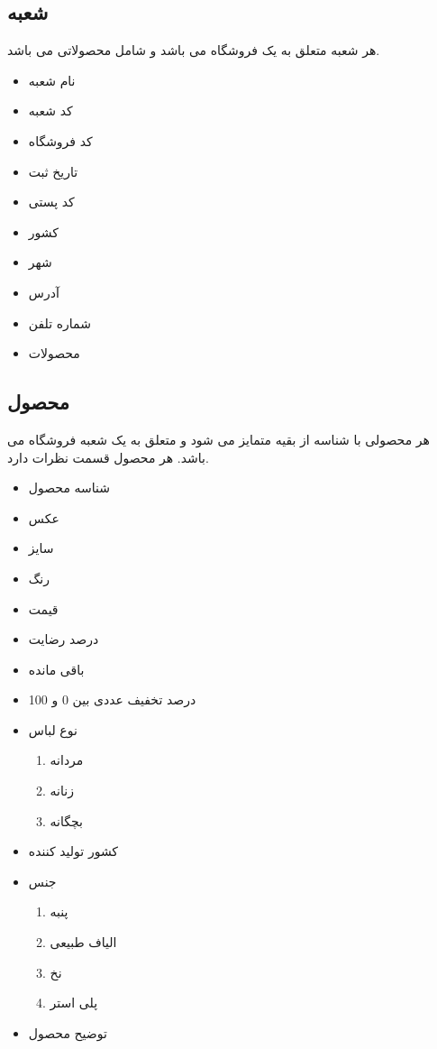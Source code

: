 \documentclass[]{article}
\begin{document}
\subsection{شعبه}
هر شعبه متعلق به یک فروشگاه می باشد و شامل محصولاتی می باشد.
\begin{itemize}
\item نام شعبه
\item کد شعبه
\item کد فروشگاه
\item تاریخ ثبت  
\item کد پستی
\item کشور
\item شهر
\item آدرس
\item شماره تلفن
\item محصولات
\end{itemize}



\subsection{محصول}
هر محصولی با شناسه از بقیه متمایز می شود و متعلق به یک شعبه فروشگاه می باشد. هر محصول قسمت نظرات دارد.
\begin{itemize}
\item شناسه محصول
\item عکس
\item سایز
\item رنگ
\item قیمت
\item درصد رضایت
\item باقی مانده
\item درصد تخفیف \newline
عددی بین 0 و 100
\item  نوع لباس
\begin{enumerate}
\item مردانه
\item زنانه
\item بچگانه
\end{enumerate}
\item کشور تولید کننده
\item جنس
\begin{enumerate}
\item پنبه
\item الیاف طبیعی
\item نخ
\item پلی استر
\end{enumerate}

\item توضیح محصول

\end{itemize}
\end{document}
